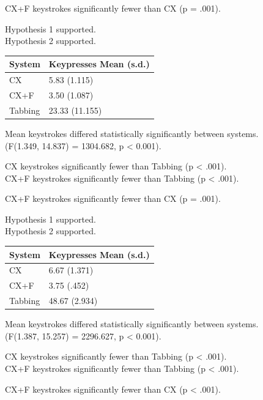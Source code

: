 \documentclass[11pt,openright,a4paper]{report}
\begin{document}
CX+F keystrokes significantly fewer than CX (p = .001).

Hypothesis 1 supported.\\
Hypothesis 2 supported.

\begin{tabular}{l l}
\hline\hline %
System & Keypresses Mean (s.d.) \\ [0.5ex] %
\hline %
CX & 5.83 (1.115)\\
CX+F & 3.50 (1.087)\\
Tabbing & 23.33 (11.155)\\ [1ex] %
\hline %
\end{tabular}

Mean keystrokes differed statistically significantly between systems.\\
(F(1.349, 14.837) = 1304.682, p < 0.001).

CX keystrokes significantly fewer than Tabbing (p < .001).\\
CX+F keystrokes significantly fewer than Tabbing (p < .001).

CX+F keystrokes significantly fewer than CX (p = .001).

Hypothesis 1 supported.\\
Hypothesis 2 supported.

\begin{tabular}{l l}
\hline\hline %
System & Keypresses Mean (s.d.) \\ [0.5ex] %
\hline %
CX & 6.67 (1.371)\\
CX+F & 3.75 (.452)\\
Tabbing & 48.67 (2.934)\\ [1ex] %
\hline %
\end{tabular}

Mean keystrokes differed statistically significantly between systems.\\
(F(1.387, 15.257) = 2296.627, p < 0.001).

CX keystrokes significantly fewer than Tabbing (p < .001).\\
CX+F keystrokes significantly fewer than Tabbing (p < .001).

CX+F keystrokes significantly fewer than CX (p < .001).
\end{document}
